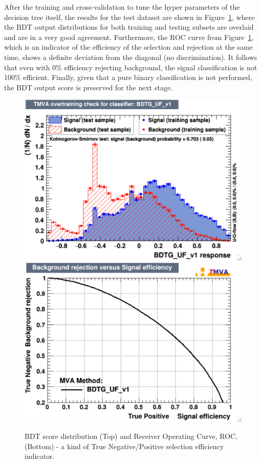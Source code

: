 After the training and cross-validation to tune the hyper parameters of the decision tree itself, the results for the test dataset are shown in Figure~\ref{fig:higgs_categorization_bdtoutputroc}, where the BDT output distributions for both training and testing subsets are overlaid and are in a very good agreement. Furthermore, the ROC curve from Figure~\ref{fig:higgs_categorization_bdtoutputroc}, which is an indicator of the efficiency of the selection and rejection at the same time, shows a definite deviation from the diagonal (no discrimination). It follows that even with 0\% efficiency rejecting background, the signal classification is not 100\% efficient. Finally, given that a pure binary classification is not performed, the BDT output score is preserved for the next stage.
\begin{figure}[htbp]
  \centering
  \includegraphics[width=0.75\linewidth]{figures/bdt_training/BDT_out_ge0j_all.pdf}\\
  \includegraphics[width=0.75\linewidth]{figures/bdt_training/BDT_ROC_ge0j_all.pdf}
  \caption{BDT score distribution (Top) and Receiver Operating Curve, ROC, (Bottom) - a kind of True Negative/Positive selection efficiency indicator.}
  \label{fig:higgs_categorization_bdtoutputroc}
\end{figure}

